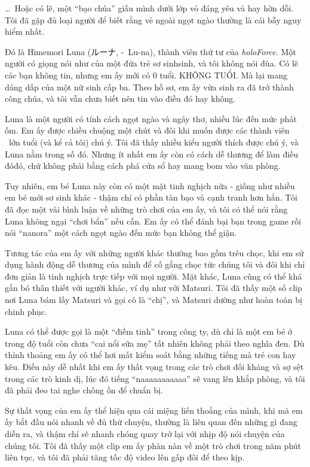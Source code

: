 \documentclass[../main.tex]{subfiles}
\begin{document}
\dots\ Hoặc có lẽ, một ``bạo chúa'' giấu mình dưới lớp vỏ đáng yêu và hay hờn dỗi. Tôi đã gặp đủ loại người để biết rằng vẻ ngoài ngọt ngào thường là cái bẫy nguy hiểm nhất.

\chrint

Đó là Himemori Luna (ルーナ, -\ Lu-na), thành viên thứ tư của \textit{holoForce}. Một người có giọng nói như của một đứa trẻ sơ sinhsinh, và tôi không nói đùa. Có lẽ các bạn không tin, nhưng em ấy mới có 0 tuổi. KHÔNG TUỔI. Mà lại mang dáng dấp của một nữ sinh cấp ba. Theo hồ sơ, em ấy vừa sinh ra đã trở thành công chúa, và tôi vẫn chưa biết nên tin vào điều đó hay không.

Luna là một người có tính cách ngọt ngào và ngây thơ, nhiều lúc đến mức phát ốm. Em ấy được chiều chuộng một chút và đôi khi muốn được các thành viên \hll\ lớn tuổi (và kể cả tôi) chú ý. Tôi đã thấy nhiều kiểu người thích được chú ý, và Luna nằm trong số đó. Nhưng ít nhất em ấy còn có cách dễ thương để làm điều đóđó, chứ không phải bằng cách phá cửa sổ hay mang bom vào văn phòng.

Tuy nhiên, em bé Luna này còn có một mặt tinh nghịch nữa - giống như nhiều em bé mới sơ sinh khác - thậm chí có phần tàn bạo và cạnh tranh hơn hẳn. Tôi đã đọc một vài bình luận về những trò chơi của em ấy, và tôi có thể nói rằng Luna không ngại ``chơi bẩn'' nếu cần. Em ấy có thể đánh bại bạn trong game rồi nói ``nanora'' một cách ngọt ngào đến mức bạn không thể giận.


Tương tác của em ấy với những người khác thường bao gồm trêu chọc, khi em sử dụng hành động dễ thương của mình để cố gắng chọc tức chúng tôi và đôi khi chỉ đơn giản là tinh nghịch trực tiếp với mọi người. Mặt khác, Luna cũng có thể khá gắn bó thân thiết với người khác, ví dụ như với Matsuri. Tôi đã thấy một số clip nơi Luna bám lấy Matsuri và gọi cô là ``chị'', và Matsuri dường như hoàn toàn bị chinh phục.

Luna có thể được gọi là một ``điềm tinh'' trong công ty, dù chỉ là một em bé ở trong độ tuổi còn chưa ``cai nổi sữa mẹ'' tất nhiên không phải theo nghĩa đen. Dù thỉnh thoảng em ấy có thể hơi mất kiểm soát bằng những tiếng mà trẻ con hay kêu. Điều này dễ nhất khi em ấy thất vọng trong các trò chơi đối kháng và sợ sệt trong các trò kinh dị, lúc đó tiếng ``naaaaaaaaaaa'' sẽ vang lên khắp phòng, và tôi đã phải đeo tai nghe chống ồn để chuẩn bị.

Sự thất vọng của em ấy thể hiện qua cái miệng liến thoắng của mình, khi mà em ấy bắt đầu nói nhanh về đủ thứ chuyện, thường là liên quan đến những gì đang diễn ra, và thậm chí sẽ nhanh chóng quay trở lại với nhịp độ nói chuyện của chúng tôi. Tôi đã thấy một clip em ấy phàn nàn về một trò chơi trong năm phút liên tục, và tôi đã phải tăng tốc độ video lên gấp đôi để theo kịp.
\end{document}
